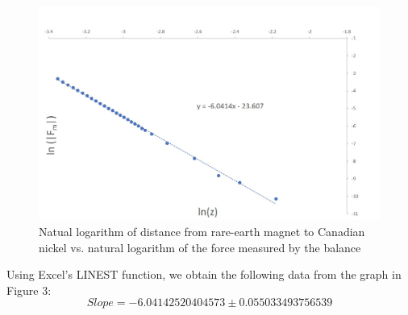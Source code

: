 \documentclass[letterpaper]{article}
\begin{document}
\begin{figure}[H]
 \centering
 \includegraphics[width=\textwidth]{nickel.jpg}
 \caption{Natual logarithm of distance from rare-earth magnet to Canadian nickel vs. natural logarithm of the force measured by the balance }
\end{figure}
\noindent Using Excel's LINEST function, we obtain the following data from the graph in Figure 3:
$$Slope =-6.04142520404573 \pm 0.055033493756539 $$
\end{document}
